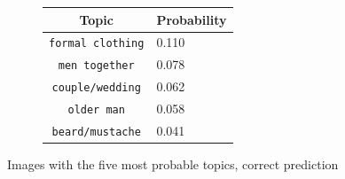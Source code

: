 \documentclass[twoside,twocolumn]{article}
\begin{document}
\begin{figure}
\begin{subfigure}{\textwidth}
\begin{minipage}[t][4cm]{.5\linewidth}
			\end{minipage}\hfill
			\begin{minipage}[t]{.5\textwidth}
				\centering
				\vspace{0pt}
				\begin{tabular}{cl}
					Topic                           & Probability\\
					\hline
					\texttt{formal clothing}             & 0.110 \\
					\texttt{men together}                   & 0.078 \\
					\texttt{couple/wedding}                 & 0.062 \\
					\texttt{older man}           & 0.058 \\
					\texttt{beard/mustache}        & 0.041\\
					\hline
				\end{tabular}
			\end{minipage}
		\end{subfigure}
		\caption{Images with the five most probable topics, correct prediction}
		\label{fig:predcorrect}
	\end{figure}
	
\end{document}
